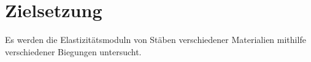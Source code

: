 
\section{Zielsetzung}
\label{sec:Zielsetzung}
Es werden die Elastizitätsmoduln von Stäben verschiedener Materialien mithilfe verschiedener Biegungen untersucht.
